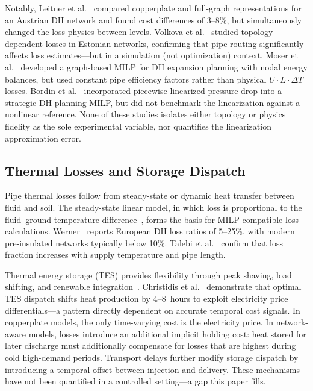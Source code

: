 \documentclass[review,3p]{elsarticle}
\begin{document}
Notably, Leitner et al.~\cite{Leitner2019} compared copperplate and
full-graph representations for an Austrian DH network and found cost
differences of 3--8\%, but simultaneously changed the loss physics
between levels. Volkova et al.~\cite{Volkova2018} studied
topology-dependent losses in Estonian networks, confirming that pipe
routing significantly affects loss estimates---but in a simulation
(not optimization) context. Moser et al.~\cite{Moser2020} developed
a graph-based MILP for DH expansion planning with nodal energy
balances, but used constant pipe efficiency factors rather than
physical $U \cdot L \cdot \Delta T$ losses. Bordin et
al.~\cite{Bordin2016} incorporated piecewise-linearized pressure
drop into a strategic DH planning MILP, but did not benchmark the
linearization against a nonlinear reference. None of these studies
isolates either topology or physics fidelity as the sole
experimental variable, nor quantifies the linearization
approximation error.

\subsection{Thermal Losses and Storage Dispatch}
\label{sec:rw_losses_storage}

Pipe thermal losses follow from steady-state or dynamic heat transfer
between fluid and soil. The steady-state linear model, in which loss
is proportional to the fluid--ground temperature
difference~\cite{Paalsson1999,Frederiksen2013}, forms the basis for
MILP-compatible loss calculations. Werner~\cite{Werner2017} reports
European DH loss ratios of 5--25\%, with modern pre-insulated
networks typically below 10\%. Talebi et al.~\cite{Talebi2016}
confirm that loss fraction increases with supply temperature and
pipe length.

Thermal energy storage (TES) provides flexibility through peak
shaving, load shifting, and renewable
integration~\cite{Vandermeulen2018,Guelpa2019review}. Christidis et
al.~\cite{Christidis2017} demonstrate that optimal TES dispatch
shifts heat production by 4--8~hours to exploit electricity price
differentials---a pattern directly dependent on accurate temporal
cost signals. In copperplate models, the only time-varying cost is
the electricity price. In network-aware models, losses introduce an
additional implicit holding cost: heat stored for later discharge
must additionally compensate for losses that are highest during cold
high-demand periods. Transport delays further modify storage dispatch
by introducing a temporal offset between injection and delivery. These
mechanisms have not been quantified in a controlled setting---a gap
this paper fills.
\end{document}
